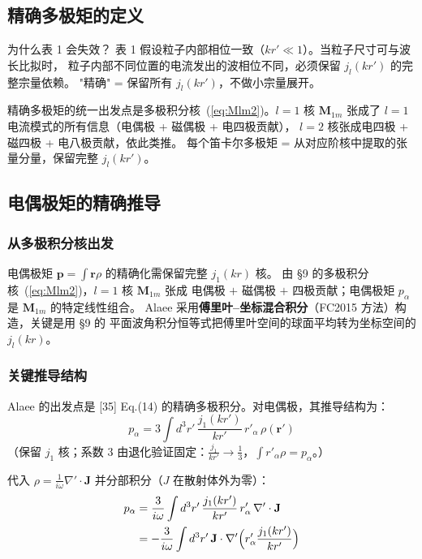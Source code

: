 \subsection{精确多极矩的定义}

\begin{stepbox}{为什么表 1 会失效？}
表 1 假设粒子内部相位一致（$kr'\ll1$）。当粒子尺寸可与波长比拟时，
粒子内部不同位置的电流发出的波相位不同，必须保留 $j_l(kr')$ 的完整宗量依赖。
"精确" = 保留所有 $j_l(kr')$，不做小宗量展开。
\end{stepbox}

精确多极矩的统一出发点是多极积分核~(\ref{eq:Mlm2})。$l=1$ 核 $\mathbf{M}_{1m}$
张成了 $l=1$ 电流模式的所有信息（电偶极 + 磁偶极 + 电四极贡献），
$l=2$ 核张成电四极 + 磁四极 + 电八极贡献，依此类推。
每个笛卡尔多极矩 = 从对应阶核中提取的张量分量，保留完整 $j_l(kr')$。

\subsection{电偶极矩的精确推导}

\subsubsection{从多极积分核出发}

电偶极矩 $\mathbf{p}=\int\mathbf{r}\rho$ 的精确化需保留完整 $j_1(kr)$ 核。
由 \S9 的多极积分核~(\ref{eq:Mlm2})，$l=1$ 核 $\mathbf{M}_{1m}$ 张成
电偶极 $+$ 磁偶极 $+$ 四极贡献；电偶极矩 $p_\alpha$ 是 $\mathbf{M}_{1m}$ 的特定线性组合。
Alaee 采用\textbf{傅里叶--坐标混合积分}（FC2015 方法）构造，关键是用 \S9 的
平面波角积分恒等式把傅里叶空间的球面平均转为坐标空间的 $j_l(kr)$。

\subsubsection{关键推导结构}

Alaee 的出发点是 [35] Eq.(14) 的精确多极积分。对电偶极，其推导结构为：
\begin{equation}
  p_\alpha = 3\int d^3r'\,\frac{j_1(kr')}{kr'}\,r'_\alpha\,\rho(\mathbf{r}')
  \label{eq:p_start}
\end{equation}
（保留 $j_1$ 核；系数 $3$ 由退化验证固定：$\frac{j_1}{kr'}\to\frac13$，$\int r'_\alpha\rho = p_\alpha$。）

代入 $\rho = \frac{1}{i\omega}\nabla'\cdot\mathbf{J}$ 并分部积分（$J$ 在散射体外为零）：
\begin{align}
  p_\alpha &= \frac{3}{i\omega}\int d^3r'\,\frac{j_1(kr')}{kr'}\,r'_\alpha\,\nabla'\cdot\mathbf{J} \notag\\
  &= -\frac{3}{i\omega}\int d^3r'\,\mathbf{J}\cdot\nabla'\Bigl(r'_\alpha\frac{j_1(kr')}{kr'}\Bigr)
\end{align}

